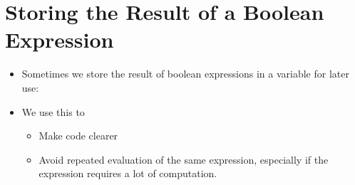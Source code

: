 \documentclass[letterpaper,10pt,english]{sphinxmanual}
\begin{document}
\section{Storing the Result of a Boolean Expression}
\label{\detokenize{lecture_notes/lec11_conditionals2:storing-the-result-of-a-boolean-expression}}\begin{itemize}
\item {} 
Sometimes we store the result of boolean expressions in a variable
for later use:

%
\begin{sphinxVerbatim}[commandchars=\\\{\}]
  
    
 
\end{sphinxVerbatim}

\item {} 
We use this to
\begin{itemize}
\item {} 
Make code clearer

\item {} 
Avoid repeated evaluation of the same expression, especially if
the expression requires a lot of computation.

\end{itemize}

\end{itemize}
\end{document}
